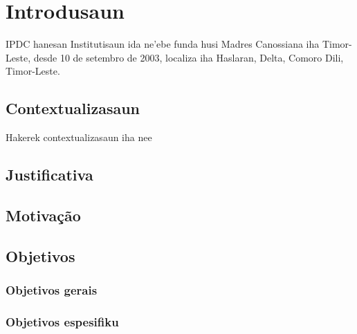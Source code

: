 \cleardoublepage
\addto\captionenglish{
\renewcommand{\chaptername}{Kapítulu}
}

\chapter{Introdusaun}

IPDC hanesan Institutisaun ida ne'ebe funda husi Madres Canossiana iha Timor-Leste, desde 10 de setembro de 2003, localiza iha Haslaran, Delta, Comoro Dili, Timor-Leste.

\section{Contextualizasaun}
Hakerek contextualizasaun iha nee


\section{Justificativa}
\section{Motivação}
\section{Objetivos}
\subsection{Objetivos gerais}
\subsection{Objetivos espesifiku}
